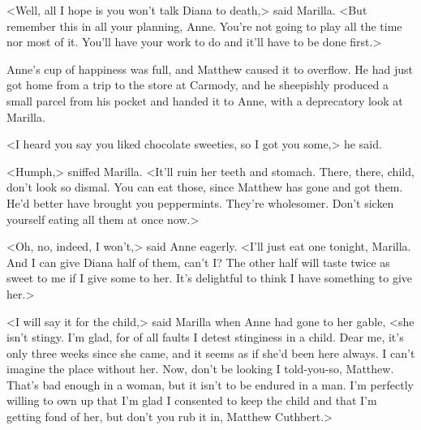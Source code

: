 <Well, all I hope is you won't talk Diana to death,> said Marilla. <But remember this in all your planning, Anne. You're not going to play all the time nor most of it. You'll have your work to do and it'll have to be done first.>

Anne's cup of happiness was full, and Matthew caused it to overflow. He had just got home from a trip to the store at Carmody, and he sheepishly produced a small parcel from his pocket and handed it to Anne, with a deprecatory look at Marilla.

<I heard you say you liked chocolate sweeties, so I got you some,> he said.

<Humph,> sniffed Marilla. <It'll ruin her teeth and stomach. There, there, child, don't look so dismal. You can eat those, since Matthew has gone and got them. He'd better have brought you peppermints. They're wholesomer. Don't sicken yourself eating all them at once now.>

<Oh, no, indeed, I won't,> said Anne eagerly. <I'll just eat one tonight, Marilla. And I can give Diana half of them, can't I\@? The other half will taste twice as sweet to me if I give some to her. It's delightful to think I have something to give her.>

<I will say it for the child,> said Marilla when Anne had gone to her gable, <she isn't stingy. I'm glad, for of all faults I detest stinginess in a child. Dear me, it's only three weeks since she came, and it seems as if she'd been here always. I can't imagine the place without her. Now, don't be looking I told-you-so, Matthew. That's bad enough in a woman, but it isn't to be endured in a man. I'm perfectly willing to own up that I'm glad I consented to keep the child and that I'm getting fond of her, but don't you rub it in, Matthew Cuthbert.>
